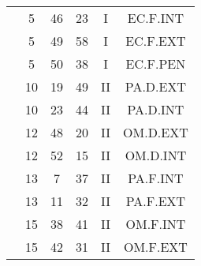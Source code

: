 \documentclass[12pt, a4paper]{article}
\begin{document}
\begin{multicols}{3}
{\begin{tabular}{c c c c c c}
	 	 	 	 & 5 & 46 & 23 & I & EC.F.INT\\%
	 	 	 	 & 5 & 49 & 58 & I & EC.F.EXT\\%
	 	 	 	 & 5 & 50 & 38 & I & EC.F.PEN\\%
	 	 	 	 & 10 & 19 & 49 & II & PA.D.EXT\\%
	 	 	 	 & 10 & 23 & 44 & II & PA.D.INT\\%
	 	 	 	 & 12 & 48 & 20 & II & OM.D.EXT\\%
	 	 	 	 & 12 & 52 & 15 & II & OM.D.INT\\%
	 	 	 	 & 13 & 7 & 37 & II & PA.F.INT\\%
	 	 	 	 & 13 & 11 & 32 & II & PA.F.EXT\\%
	 	 	 	 & 15 & 38 & 41 & II & OM.F.INT\\%
	 	 	 	 & 15 & 42 & 31 & II & OM.F.EXT\\%
	 	 \end{tabular}
 	}
\end{multicols}
\end{document}
